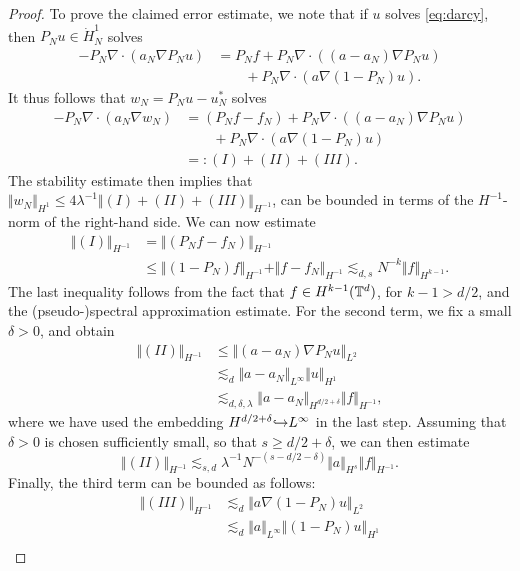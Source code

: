 \documentclass[reqno,a4paper]{amsart}
\begin{document}
\begin{proof}
To prove the claimed error estimate, we note that if $u$ solves \eqref{eq:darcy}, then $P_N u \in \dot{H}^1_N$ solves
\begin{align*}
-P_N \nabla \cdot (a_N \nabla P_N u) 
&= P_N f + P_N \nabla \cdot ((a-a_N) \nabla P_N u) 
\\
&\qquad + P_N \nabla \cdot (a \nabla (1-P_N) u).
\end{align*}
It thus follows that $w_N = P_Nu - u_N^\ast$ solves
\begin{align*}
-P_N \nabla \cdot (a_N \nabla w_N) 
&= (P_Nf -f_N) + P_N \nabla \cdot ((a-a_N) \nabla P_N u) 
\\
&\qquad + P_N \nabla \cdot (a \nabla (1-P_N) u)
\\
&=: (I) + (II) + (III).
\end{align*}
The stability estimate then implies that $\Vert w_N\Vert_{{H}^{1}} \le 4\lambda^{-1} \Vert (I) + (II) + (III) \Vert_{H^{-1}}$, can be bounded in terms of the $H^{-1}$-norm of the right-hand side. We can now estimate
\begin{align*}
\Vert (I)\Vert_{H^{-1}} 
&=
\Vert (P_Nf - f_N) \Vert_{H^{-1}}
\\
&\le 
\Vert (1-P_N)f \Vert_{H^{-1}}
+
\Vert f - f_N \Vert_{H^{-1}}
\lesssim_{d,s}
N^{-k} \Vert f \Vert_{H^{k-1}}.
\end{align*}
The last inequality follows from the fact that $f \in H^{k-1}(\mathbb{T}^d)$, for $k-1>d/2$, and the (pseudo-)spectral approximation estimate.
For the second term, we fix a small $\delta > 0$, and obtain
\begin{align*}
\Vert (II)\Vert_{H^{-1}} &\le
\Vert 
(a-a_N)
\nabla P_N u 
\Vert_{L^2}
\\
&\lesssim_{d}
\Vert 
a-a_N
\Vert_{L^\infty}
\Vert
u
\Vert_{H^1}
\\
&\lesssim_{d,\delta,\lambda}
\Vert 
a-a_N
\Vert_{H^{d/2+\delta}}
\Vert
f
\Vert_{H^{-1}},
\end{align*}
where we have used the embedding $H^{d/2+\delta} {\hookrightarrow} L^\infty$ in the last step. Assuming that $\delta>0$ is chosen sufficiently small, so that $s\ge d/2+\delta$, we can then estimate
\[
\Vert (II) \Vert_{H^{-1}}
\lesssim_{s,d}
\lambda^{-1}
N^{-(s-d/2-\delta)}
\Vert a \Vert_{H^s}\Vert f \Vert_{H^{-1}}.
\]
Finally, the third term can be bounded as follows:
\begin{align*}
\Vert (III)\Vert_{H^{-1}}
&\lesssim_{d}
\Vert a \nabla (1-P_N) u \Vert_{L^2}
\\
&\lesssim_{d}
\Vert a \Vert_{L^\infty} \Vert (1-P_N) u \Vert_{H^1}
\\

\end{align*}
\end{proof}
\end{document}
